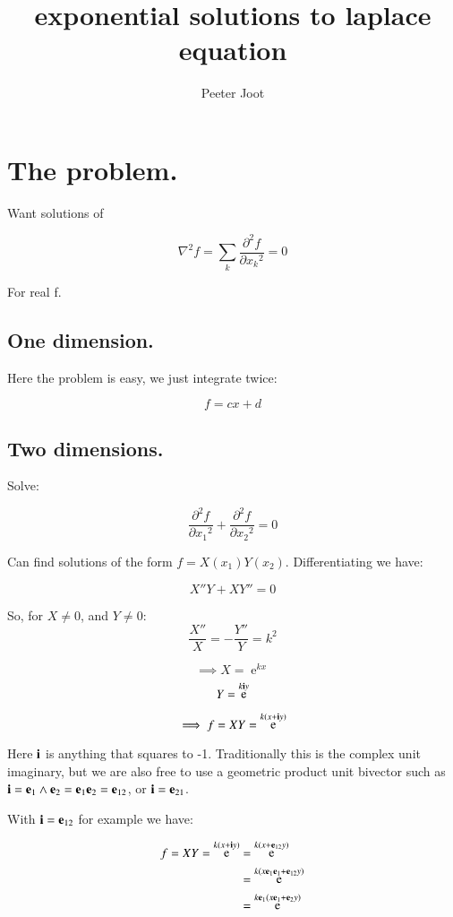 \documentclass{article}      %
\title{exponential solutions to laplace equation}
\author{Peeter Joot}         %
\newcommand{\laplacian}[0]{\nabla^2}
\newcommand{\dsqxj}[2] {\frac {\partial^2 {#1}} {\partial {x_{#2}}^2}}
\DeclareMathOperator{\Exp}{e}
\begin{document}

\maketitle{}

\section{ The problem. }

Want solutions of

\[
\laplacian f = \sum_k \dsqxj{f}{k} = 0
\]

For real f.

\subsection{ One dimension. }

Here the problem is easy, we just integrate twice:

\[
f = cx + d
\]

\subsection{ Two dimensions. }

Solve:

\[
\dsqxj{f}{1} + \dsqxj{f}{2} = 0
\]

Can find solutions of the form $f = X(x_1)Y(x_2)$.  Differentiating we have:

\[
X''Y + XY'' = 0
\]

So, for $X \ne 0$, and $Y \ne 0$:
\[
\frac{X''}{X} = -\frac{Y''}{Y} = k^2
\]

\[
\implies
X = \Exp^{kx}
\]
\[
Y = \Exp^{k\Bi y}
\]

\[
\implies
f = XY = \Exp^{k(x + \Bi y)}
\]

Here $\mathbf{i}$ is anything that squares to -1.  Traditionally this is the
complex unit imaginary, but we are also free to use a geometric product unit bivector such as $\mathbf{i} = \mathbf{e}_1 \wedge \mathbf{e}_2 = \mathbf{e}_1\mathbf{e}_2 = \mathbf{e}_{12}$, or $\mathbf{i} = \mathbf{e}_{21}$.

With $\mathbf{i} = \mathbf{e}_{12}$ for example we have:

\begin{align*}
f = XY = \Exp^{k(x + \Bi y)} 
&= \Exp^{k(x + \Be_{12} y)} \\
&= \Exp^{k(x\Be_{1}\Be_1 + \Be_{12} y)} \\
&= \Exp^{k\Be_1(x\Be_1 + \Be_2 y)} \\
\end{align*}
\end{document}
